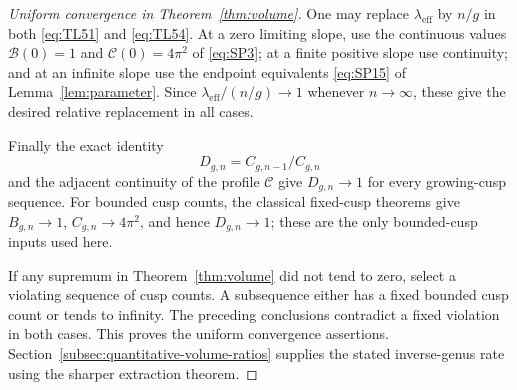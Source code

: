 \begin{proof}[Uniform convergence in Theorem~\ref{thm:volume}]
One may replace \(\lambda_{\mathrm{eff}}\) by \(n/g\) in both \eqref{eq:TL51} and
\eqref{eq:TL54}. At a zero limiting slope, use the continuous values
\(\mathcal B(0)=1\) and \(\mathcal C(0)=4\pi^2\) of \eqref{eq:SP3}; at a
finite positive slope use continuity; and at an infinite slope use the
endpoint equivalents \eqref{eq:SP15} of Lemma~\ref{lem:parameter}.
Since \(\lambda_{\mathrm{eff}}/(n/g)\to1\) whenever \(n\to\infty\),
these give the desired relative replacement in all cases.

Finally the exact identity \begin{equation}
D_{g,n}=C_{g,n-1}/C_{g,n}
 \label{eq:TL56}
\end{equation} and the adjacent continuity of the profile \(\mathcal C\) give
\(D_{g,n}\to1\) for every growing-cusp sequence. For bounded cusp
counts, the classical fixed-cusp theorems give \(B_{g,n}\to1\),
\(C_{g,n}\to4\pi^2\), and hence \(D_{g,n}\to1\); these are the only
bounded-cusp inputs used here.

If any supremum in Theorem~\ref{thm:volume} did not tend to zero, select a violating
sequence of cusp counts. A subsequence either has a fixed bounded cusp
count or tends to infinity. The preceding conclusions contradict a fixed
violation in both cases. This proves the uniform convergence assertions.
Section~\ref{subsec:quantitative-volume-ratios} supplies the stated
inverse-genus rate using the sharper extraction theorem.

\end{proof}


